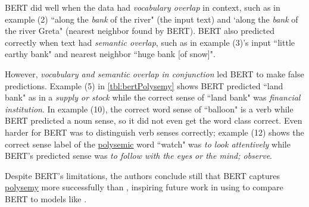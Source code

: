 BERT did well when the data had \emph{vocabulary overlap} in context, such as in example (2) ``along the \emph{bank} of the river" (the input text) and `along the \emph{bank} of the river Greta" (nearest neighbor found by BERT). BERT also predicted correctly when text had \emph{semantic overlap}, such as in example (3)'s input ``little earthy bank" and nearest neighbor ``huge bank [of snow]". 

However, \emph{vocabulary and semantic overlap in conjunction} led BERT to make false predictions. Example (5) in \cref{tbl:bertPolysemy} shows BERT predicted ``land bank" as in a \emph{supply or stock} while the correct sense of ``land bank" was \emph{financial institution}. In example (10), the correct word sense of ``balloon" is a verb while BERT predicted a noun sense, so it did not even get the word class correct. Even harder for BERT was to distinguish verb senses correctly; example (12) shows the correct sense label of the \hyperref[sec:Polysemy]{polysemic} word ``watch" was \emph{to look attentively} while BERT's predicted sense was \emph{to follow with the eyes or the mind; observe}. 

Despite BERT's limitations, the authors conclude still that BERT captures \hyperref[sec:Polysemy]{polysemy} more successfully than , inspiring future work in using  to compare BERT to models like . 